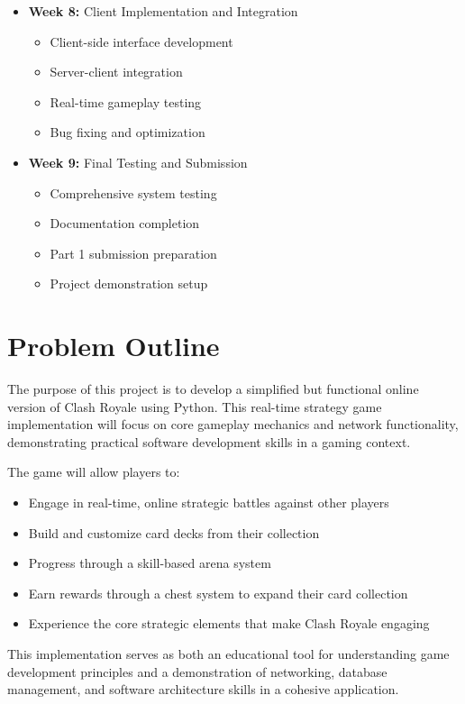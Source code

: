 \documentclass{article}
\begin{document}
\begin{itemize}[leftmargin=*]
    \item \textbf{Week 8:} Client Implementation and Integration
    \begin{itemize}
        \item Client-side interface development
        \item Server-client integration
        \item Real-time gameplay testing
        \item Bug fixing and optimization
    \end{itemize}
    
    \item \textbf{Week 9:} Final Testing and Submission
    \begin{itemize}
        \item Comprehensive system testing
        \item Documentation completion
        \item Part 1 submission preparation
        \item Project demonstration setup
    \end{itemize}
\end{itemize}

\section{Problem Outline}

The purpose of this project is to develop a simplified but functional online version of Clash Royale using Python. This real-time strategy game implementation will focus on core gameplay mechanics and network functionality, demonstrating practical software development skills in a gaming context.

\noindent The game will allow players to:
\begin{itemize}
    \item Engage in real-time, online strategic battles against other players
    \item Build and customize card decks from their collection
    \item Progress through a skill-based arena system
    \item Earn rewards through a chest system to expand their card collection
    \item Experience the core strategic elements that make Clash Royale engaging
\end{itemize}

\noindent This implementation serves as both an educational tool for understanding game development principles and a demonstration of networking, database management, and software architecture skills in a cohesive application.
\end{document}

